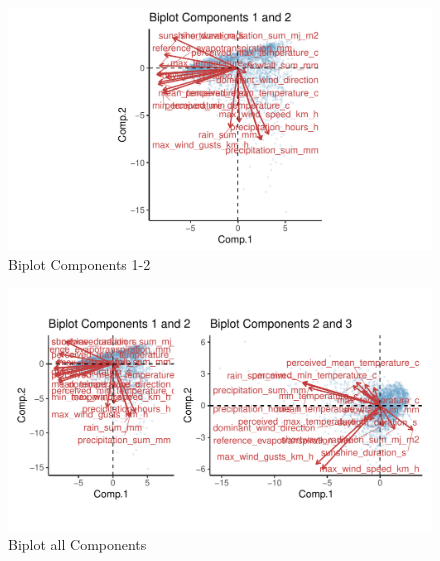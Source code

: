 \documentclass[
]{article}
\begin{document}
\begin{figure}[H]

{\centering \includegraphics[width=0.8\linewidth]{Assignment2_Group9_files/figure-latex/unnamed-chunk-5-1} 

}

\caption{ Biplot Components 1-2}\label{fig:unnamed-chunk-5}
\end{figure}

\begin{figure}[H]

{\centering \includegraphics[width=0.8\linewidth]{Assignment2_Group9_files/figure-latex/unnamed-chunk-6-1} 

}

\caption{Biplot all Components}\label{fig:unnamed-chunk-6}
\end{figure}
\end{document}
